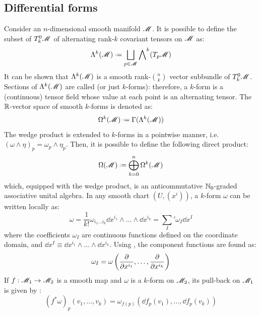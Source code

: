 \subsection{Differential forms}

Consider an $ n $-dimensional smooth manifold $ \mathscr{M} $. It is possible to define the subset of $ T^0_k\mathscr{M} $ of alternating rank-$ k $ covariant tensors on $ \mathscr{M} $ as:
\begin{equation}
  \lm{k} \defeq \bigsqcup_{p \in \man} \lv{k}(T_p\man)
\end{equation}
It can be shown that $ \Lambda^{k}(\mathscr{M}) $ is a smooth rank-$ \binom{n}{k} $ vector subbundle of $ T^0_k\mathscr{M} $. Sections of $ \Lambda^{k}(\mathscr{M}) $ are called  (or just $ k $-forms): therefore, a $ k $-form is a (continuous) tensor field whose value at each point is an alternating tensor. The $ \mathbb{R} $-vector space of smooth $ k $-forms is denoted as:
\begin{equation}
  \df{k} \defeq \Gamma(\lm{k})
\end{equation}
The wedge product is extended to $ k $-forms in a pointwise manner, i.e. $ (\omega \wedge \eta)_p = \omega_p \wedge \eta_p $. Then, it is possible to define the following direct product:
\begin{equation}
  \dft \defeq \bigoplus_{k = 0}^n \df{k}
\end{equation}
which, equipped with the wedge product, is an anticommutative $ \mathbb{N}_0 $-graded associative unital algebra. In any smooth chart $ (U,(x^i)) $, a $ k $-form $ \omega $ can be written locally as:
\begin{equation}
  \omega = \frac{1}{k!} \omega_{i_1 \dots i_k} \dd x^{i_1} \wedge \dots \wedge \dd x^{i_k} = {\sum_I}' \omega_I \dd x^I
  \label{eq:diff-form-basis}
\end{equation}
where the coefficients $ \omega_I $ are continuous functions defined on the coordinate domain, and $ \dd x^I \equiv \dd x^{i_1} \wedge \dots \wedge \dd x^{i_k} $. Using , the component functions are found as:
\begin{equation*}
  \omega_I = \omega\left( \frac{\partial}{\partial x^{i_1}} , \dots , \frac{\partial}{\partial x^{i_k}} \right)
\end{equation*}
If $ f : \mathscr{M}_1 \rightarrow \mathscr{M}_2 $ is a smooth map and $ \omega $ is a $ k $-form on $ \mathscr{M}_2 $, its pull-back on $ \mathscr{M}_1 $ is given by :
\begin{equation*}
  (f^*\omega)_p(v_1 , \dots , v_k) = \omega_{f(p)}(\dd f_p(v_1) , \dots , \dd f_p(v_k))
\end{equation*}

